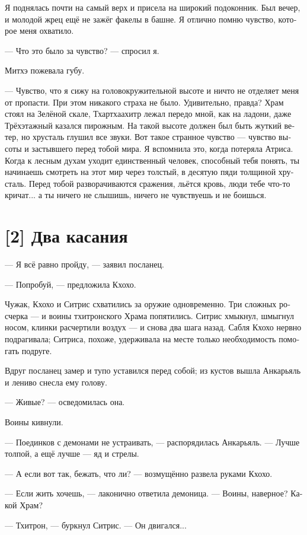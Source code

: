 \documentclass[a4paper,12pt,fleqn]{book}\usepackage{cooltooltips}\usepackage{polyglossia}\setdefaultlanguage[babelshorthands=true]{russian}\setotherlanguage{english}\defaultfontfeatures{Ligatures=TeX,Mapping=tex-text} \usepackage{xcolor}\definecolor{lightgray}{HTML}{bbbbbb}\color{lightgray}\newcommand{\ml}[3]{\textenglish{\textcolor{black}{#3}}}
\begin{document}
{Я поднялась почти на самый верх и присела на широкий подоконник.
Был вечер, и молодой жрец ещё не зажёг факелы в башне.
Я отлично помню чувство, которое меня охватило.

--- Что это было за чувство? --- спросил я.

Митхэ пожевала губу.

--- Чувство, что я сижу на головокружительной высоте и ничто не отделяет меня от пропасти.
При этом никакого страха не было.
Удивительно, правда?
Храм стоял на Зелёной скале, Тхартхаахитр лежал передо мной, как на ладони, даже Трёхэтажный казался пирожным.
На такой высоте должен был быть жуткий ветер, но хрусталь глушил все звуки.
Вот такое странное чувство --- чувство высоты и застывшего перед тобой мира.
Я вспомнила это, когда потеряла Атриса.
Когда к лесным духам уходит единственный человек, способный тебя понять, ты начинаешь смотреть на этот мир через толстый, в десятую пяди толщиной хрусталь.
Перед тобой разворачиваются сражения, льётся кровь, люди тебе что-то кричат... а ты ничего не слышишь, ничего не чувствуешь и не боишься.

\section{[2] Два касания}

--- Я всё равно пройду, --- заявил посланец.

--- Попробуй, --- предложила Кхохо.

Чужак, Кхохо и Ситрис схватились за оружие одновременно.
Три сложных росчерка --- и воины тхитронского Храма попятились.
Ситрис хмыкнул, шмыгнул носом, клинки расчертили воздух --- и снова два шага назад.
Сабля Кхохо нервно подрагивала;
Ситриса, похоже, удерживала на месте только необходимость помогать подруге.

Вдруг посланец замер и тупо уставился перед собой;
из кустов вышла Анкарьяль и лениво снесла ему голову.

--- Живые? --- осведомилась она.

Воины кивнули.

--- Поединков с демонами не устраивать, --- распорядилась Анкарьяль.
--- Лучше толпой, а ещё лучше --- яд и стрелы.

--- А если вот так, бежать, что ли? --- возмущённо развела руками Кхохо.

--- Если жить хочешь, --- лаконично ответила демоница.
--- Воины, наверное?
Какой Храм?

--- Тхитрон, --- буркнул Ситрис.
--- Он двигался...

}
\end{document}
